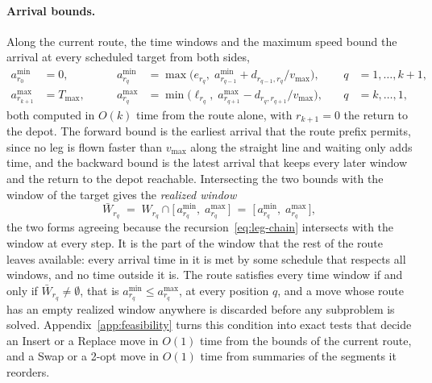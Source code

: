 \documentclass[11pt]{article}
\begin{document}
\paragraph{Arrival bounds.}
Along the current route, the time windows and the maximum speed bound the arrival at every scheduled target from both sides,
\begin{equation}\label{eq:leg-chain}
\begin{aligned}
    a^{\min}_{r_0} &= 0, &\qquad
    a^{\min}_{r_q} &= \max\!\bigl( e_{r_q},\; a^{\min}_{r_{q-1}} + d_{r_{q-1}, r_q} / v_{\max} \bigr), &\quad q &= 1, \ldots, k+1, \\
    a^{\max}_{r_{k+1}} &= T_{\max}, &\qquad
    a^{\max}_{r_q} &= \min\!\bigl( \ell_{r_q},\; a^{\max}_{r_{q+1}} - d_{r_q, r_{q+1}} / v_{\max} \bigr), &\quad q &= k, \ldots, 1,
\end{aligned}
\end{equation}
both computed in $O(k)$ time from the route alone, with $r_{k+1} = 0$ the return to the depot. The forward bound is the earliest arrival that the route prefix permits, since no leg is flown faster than $v_{\max}$ along the straight line and waiting only adds time, and the backward bound is the latest arrival that keeps every later window and the return to the depot reachable. Intersecting the two bounds with the window of the target gives the \emph{realized window}
\begin{equation}\label{eq:realized-window}
    \bar{W}_{r_q} \;=\; W_{r_q} \cap \bigl[\, a^{\min}_{r_q},\; a^{\max}_{r_q} \,\bigr] \;=\; \bigl[\, a^{\min}_{r_q},\; a^{\max}_{r_q} \,\bigr] ,
\end{equation}
the two forms agreeing because the recursion~\eqref{eq:leg-chain} intersects with the window at every step. It is the part of the window that the rest of the route leaves available: every arrival time in it is met by some schedule that respects all windows, and no time outside it is. The route satisfies every time window if and only if $\bar{W}_{r_q} \neq \emptyset$, that is $a^{\min}_{r_q} \le a^{\max}_{r_q}$, at every position $q$, and a move whose route has an empty realized window anywhere is discarded before any subproblem is solved. Appendix~\ref{app:feasibility} turns this condition into exact tests that decide an Insert or a Replace move in $O(1)$ time from the bounds of the current route, and a Swap or a 2-opt move in $O(1)$ time from summaries of the segments it reorders.
\end{document}
